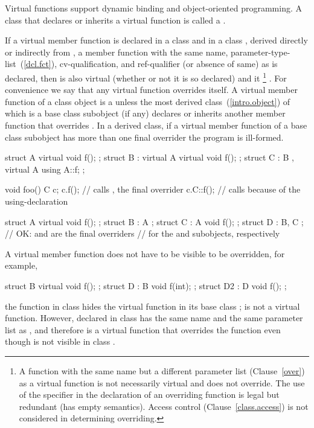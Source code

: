 \pnum
Virtual functions support dynamic binding and object-oriented
programming. A class that declares or inherits a virtual function is
called a .

\pnum
If a virtual member function  is declared in a class
 and in a class , derived directly or
indirectly from , a member function  with the same
name, parameter-type-list~(\ref{dcl.fct}), cv-qualification, and ref-qualifier
(or absence of same) as
 is declared, then  is also virtual
(whether or not it is so declared) and it \footnote{A function with the same name but a different parameter list
(Clause~\ref{over}) as a virtual function is not necessarily virtual and
does not override. The use of the  specifier in the
declaration of an overriding function is legal but redundant (has empty
semantics). Access control (Clause~\ref{class.access}) is not considered in
determining overriding.}
. For convenience we say that any virtual function
overrides itself.
%
A virtual member function  of a class object  is a  unless the most derived class~(\ref{intro.object}) of which  is a
base class subobject (if any) declares or inherits another member function that overrides
. In a derived class, if a virtual member function of a base class subobject
has more than one final overrider the program is ill-formed.
\enterexample
\begin{codeblock}
struct A {
  virtual void f();
};
struct B : virtual A {
  virtual void f();
};
struct C : B , virtual A {
  using A::f;
};

void foo() {
  C c;
  c.f();              // calls , the final overrider
  c.C::f();           // calls  because of the using-declaration
}
\end{codeblock}
\exitexample

\enterexample
\begin{codeblock}
struct A { virtual void f(); };
struct B : A { };
struct C : A { void f(); };
struct D : B, C { };  // OK:  and  are the final overriders
                      // for the  and  subobjects, respectively
\end{codeblock}
\exitexample

\pnum
\enternote
A virtual member function does not have to be visible to be overridden,
for example,
\begin{codeblock}
struct B {
  virtual void f();
};
struct D : B {
  void f(int);
};
struct D2 : D {
  void f();
};
\end{codeblock}
the function  in class  hides the virtual
function  in its base class ;  is
not a virtual function. However,  declared in class
 has the same name and the same parameter list as
, and therefore is a virtual function that overrides the
function  even though  is not visible in
class .
\exitnote

